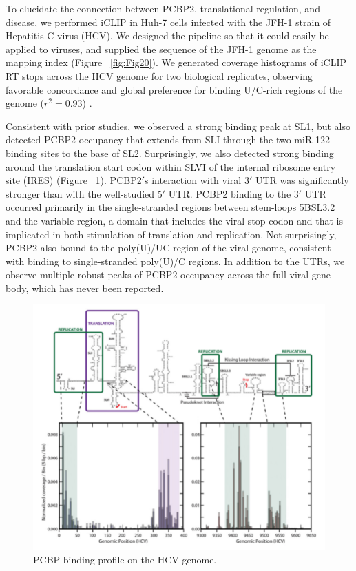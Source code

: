 To elucidate the connection between PCBP2, translational regulation, and disease, we performed iCLIP in Huh-7 cells infected with the JFH-1 strain of Hepatitis C virus (HCV). We designed the pipeline so that it could easily be applied to viruses, and supplied the sequence of the JFH-1 genome as the mapping index (Figure ~\ref{fig:Fig20}). We generated coverage histograms of iCLIP RT stops across the HCV genome for two biological replicates, observing favorable concordance and global preference for binding U/C-rich regions of the genome ($r^2 = 0.93$) \cite{Flynn:2014bi}.

Consistent with prior studies, we observed a strong binding peak at SL1, but also detected PCBP2 occupancy that extends from SLI through the two miR-122 binding sites to the base of SL2. Surprisingly, we also detected strong binding around the translation start codon within SLVI of the internal ribosome entry site (IRES) (Figure ~\ref{fig:Fig21}). PCBP2$'$s interaction with viral 3$'$ UTR was significantly stronger than with the well-studied 5$'$ UTR. PCBP2 binding to the 3$'$ UTR occurred primarily in the single-stranded regions between stem-loops 5BSL3.2 and the variable region, a domain that includes the viral stop codon and that is implicated in both stimulation of translation and replication. Not surprisingly, PCBP2 also bound to the poly(U)/UC region of the viral genome, consistent with binding to single-stranded poly(U)/C regions. In addition to the UTRs, we observe multiple robust peaks of PCBP2 occupancy across the full viral gene body, which has never been reported.

\begin{figure}
\center\includegraphics[width=150mm,scale=0.5]{Figures/Fig21}
\caption{PCBP binding profile on the HCV genome.}
\label{fig:Fig21}
\end{figure}

